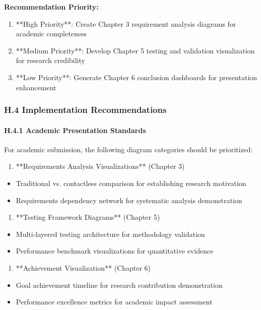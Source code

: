 \documentclass[12pt,a4paper]{article}
\begin{document}
{{\begin{itemize}
\end{itemize}
\textbf{Recommendation Priority:}

\begin{enumerate}
\item **High Priority**: Create Chapter 3 requirement analysis diagrams for academic completeness
\item **Medium Priority**: Develop Chapter 5 testing and validation visualization for research credibility
\item **Low Priority**: Generate Chapter 6 conclusion dashboards for presentation enhancement

\end{enumerate}
\subsubsection{H.4 Implementation Recommendations}

\paragraph{H.4.1 Academic Presentation Standards}

For academic submission, the following diagram categories should be prioritized:

\begin{enumerate}
\item **Requirements Analysis Visualizations** (Chapter 3)
\end{enumerate}
\begin{itemize}
\item Traditional vs. contactless comparison for establishing research motivation
\item Requirements dependency network for systematic analysis demonstration

\end{itemize}
\begin{enumerate}
\item **Testing Framework Diagrams** (Chapter 5)
\end{enumerate}
\begin{itemize}
\item Multi-layered testing architecture for methodology validation
\item Performance benchmark visualizations for quantitative evidence

\end{itemize}
\begin{enumerate}
\item **Achievement Visualization** (Chapter 6)
\end{enumerate}
\begin{itemize}
\item Goal achievement timeline for research contribution demonstration
\item Performance excellence metrics for academic impact assessment


\end{itemize}}}
\end{document}
